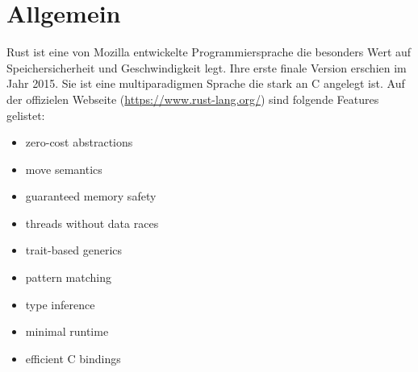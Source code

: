 \section{Allgemein}
Rust ist eine von Mozilla entwickelte Programmiersprache die besonders Wert auf Speichersicherheit und Geschwindigkeit legt. Ihre erste finale Version erschien im Jahr 2015.
Sie ist eine multiparadigmen Sprache die stark an C angelegt ist.
Auf der offizielen Webseite (\url{https://www.rust-lang.org/}) sind folgende Features gelistet:

\begin{itemize}	
\item zero-cost abstractions
\item move semantics
\item guaranteed memory safety
\item threads without data races
\item trait-based generics
\item pattern matching
\item type inference
\item minimal runtime
\item efficient C bindings
\end{itemize}






